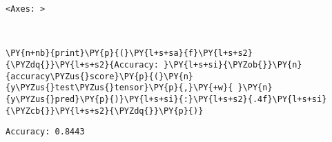             \begin{tcolorbox}[breakable, size=fbox, boxrule=.5pt, pad at break*=1mm, opacityfill=0]
\begin{Verbatim}[commandchars=\\\{\}]
<Axes: >
\end{Verbatim}
\end{tcolorbox}
        
    \begin{center}
    \end{center}
    { \hspace*{\fill} \\}
    
    \begin{tcolorbox}[breakable, size=fbox, boxrule=1pt, pad at break*=1mm,colback=cellbackground, colframe=cellborder]
\begin{Verbatim}[commandchars=\\\{\}]
\PY{n+nb}{print}\PY{p}{(}\PY{l+s+sa}{f}\PY{l+s+s2}{\PYZdq{}}\PY{l+s+s2}{Accuracy: }\PY{l+s+si}{\PYZob{}}\PY{n}{accuracy\PYZus{}score}\PY{p}{(}\PY{n}{y\PYZus{}test\PYZus{}tensor}\PY{p}{,}\PY{+w}{ }\PY{n}{y\PYZus{}pred}\PY{p}{)}\PY{l+s+si}{:}\PY{l+s+s2}{.4f}\PY{l+s+si}{\PYZcb{}}\PY{l+s+s2}{\PYZdq{}}\PY{p}{)}
\end{Verbatim}
\end{tcolorbox}

    \begin{Verbatim}[commandchars=\\\{\}]
Accuracy: 0.8443
    \end{Verbatim}

